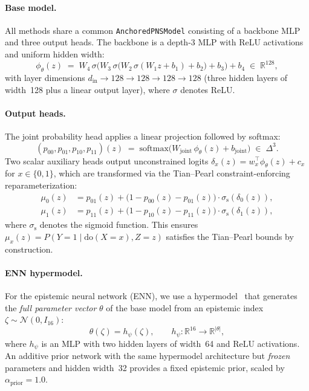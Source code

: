 \documentclass[accepted]{uai2026} %
\theoremstyle{plain}
\theoremstyle{definition}
\theoremstyle{remark}
\begin{document}
\paragraph{Base model.}
All methods share a common
\texttt{AnchoredPNSModel} consisting of a
backbone MLP and three output heads.  The
backbone is a depth-3 MLP with ReLU activations
and uniform hidden width:
\[
  \phi_\theta(z) \;=\;
    W_4 \, \sigma\!\bigl(
      W_3 \, \sigma\!\bigl(
        W_2 \, \sigma(W_1 z + b_1) + b_2
      \bigr) + b_3
    \bigr) + b_4
    \;\in\; \mathbb{R}^{128},
\]
with layer dimensions
$d_{\mathrm{in}} \to 128 \to 128 \to 128
\to 128$ (three hidden layers of width~128
plus a linear output layer), where $\sigma$
denotes ReLU.

\paragraph{Output heads.}
The joint probability head applies a linear
projection followed by softmax:
\[
  (p_{00}, p_{01}, p_{10}, p_{11})(z) \;=\;
    \mathrm{softmax}\!\bigl(
      W_{\mathrm{joint}} \, \phi_\theta(z)
      + b_{\mathrm{joint}}
    \bigr)
    \;\in\; \Delta^3.
\]
Two scalar auxiliary heads output unconstrained
logits
$\delta_x(z) = w_x^\top \phi_\theta(z) + c_x$
for $x \in \{0,1\}$, which are transformed via
the Tian--Pearl constraint-enforcing
reparameterization:
\begin{align}
  \mu_0(z) &= p_{01}(z)
    + \bigl(1 - p_{00}(z) - p_{01}(z)\bigr)
      \cdot \sigma_{\mathrm{s}}(\delta_0(z)),
    \label{eq:mu0} \\
  \mu_1(z) &= p_{11}(z)
    + \bigl(1 - p_{10}(z) - p_{11}(z)\bigr)
      \cdot \sigma_{\mathrm{s}}(\delta_1(z)),
    \label{eq:mu1}
\end{align}
where $\sigma_{\mathrm{s}}$ denotes the sigmoid
function.  This ensures
$\mu_x(z) = P(Y{=}1 \mid \mathrm{do}(X{=}x),
Z{=}z)$ satisfies the Tian--Pearl bounds by
construction.

\paragraph{ENN hypermodel.}
For the epistemic neural network (ENN), we use a
hypermodel~\citep{osband2023epistemic} that
generates the \emph{full parameter vector}
$\theta$ of the base model from an epistemic
index $\zeta \sim \mathcal{N}(0, I_{16})$:
\[
  \theta(\zeta) = h_\psi(\zeta),
  \qquad
  h_\psi \colon \mathbb{R}^{16}
    \to \mathbb{R}^{|\theta|},
\]
where $h_\psi$ is an MLP with two hidden layers
of width~64 and ReLU activations.
An additive prior network with the same
hypermodel architecture but \emph{frozen}
parameters and hidden width~32 provides a fixed
epistemic prior, scaled by
$\alpha_{\mathrm{prior}} = 1.0$.
\end{document}

